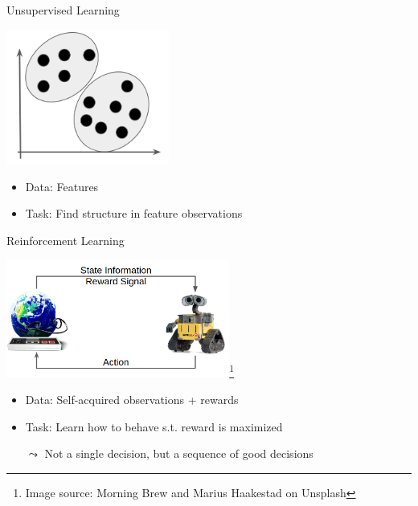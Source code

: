 \documentclass[aspectratio=169]{../latex_main/tntbeamer}  %
\begin{document}
\begin{frame}[c]{Unsupervised Learning}
	
	\centering
	\includegraphics[width=0.4\textwidth]{images/clustering.png}
	
	\bigskip
	
	\begin{itemize}
		\item Data: Features 
		\item Task: Find structure in feature observations
	\end{itemize}	
	
	
\end{frame}
\begin{frame}[c]{Reinforcement Learning}
	
		\centering
	\includegraphics[width=0.55\textwidth]{images/rl_comic.png}\footnote{Image source: Morning Brew and Marius Haakestad on Unsplash}
	
	\bigskip
	
	\begin{itemize}
		\item Data: Self-acquired observations + rewards
		\item Task: Learn how to behave s.t. reward is maximized
		\item[$\leadsto$] Not a single decision, but a sequence of good decisions
	\end{itemize}	
	
	
\end{frame}
\end{document}
